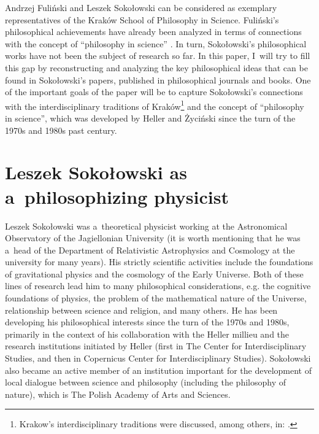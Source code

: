 \documentclass[%
  manuscript=article,
  year=2024,
  volume=77,
  doi=00000.000,
]{zfn}
\begin{document}
Andrzej Fuliński and Leszek Sokołowski can be considered as exemplary representatives of the Kraków School of Philosophy in Science. Fuliński's philosophical achievements have already been analyzed in terms of connections with the concept of ``philosophy in science'' 
\parencite[][]{Trombik2023Andrzej}. %
 In turn, Sokołowski's philosophical works have not been the subject of research so far. In this paper, I~will try to fill this gap by reconstructing and analyzing the key philosophical ideas that can be found in Sokołowski's papers, published in philosophical journals and books. One of the important goals of the paper will be to capture Sokołowski's connections with the interdisciplinary traditions of Kraków\footnote{Krakow's interdisciplinary traditions were discussed, among others, in: 
\parencites[][]{Polak201119th}[][]{Polak2018Tradycja}.%
} and the concept of ``philosophy in science'', which was developed by Heller and Życiński since the turn of the 1970s and 1980s past century.



\section{Leszek Sokołowski as a~philosophizing physicist}

Leszek Sokołowski was a~theoretical physicist working at the Astronomical Observatory of the Jagiellonian University (it is worth mentioning that he was a~head of the Department of Relativistic Astrophysics and Cosmology at the university for many years). His strictly scientific activities include the foundations of gravitational physics and the cosmology of the Early Universe. Both of these lines of research lead him to many philosophical considerations, e.g. the cognitive foundations of physics, the problem of the mathematical nature of the Universe, relationship between science and religion, and many others. He has been developing his philosophical interests since the turn of the 1970s and 1980s, primarily in the context of his collaboration with the Heller millieu and the research institutions initiated by Heller (first in The Center for Interdisciplinary Studies, and then in Copernicus Center for Interdisciplinary Studies). Sokołowski also became an active member of an institution important for the development of local dialogue between science and philosophy (including the philosophy of nature), which is The Polish Academy of Arts and Sciences.
\end{document}
